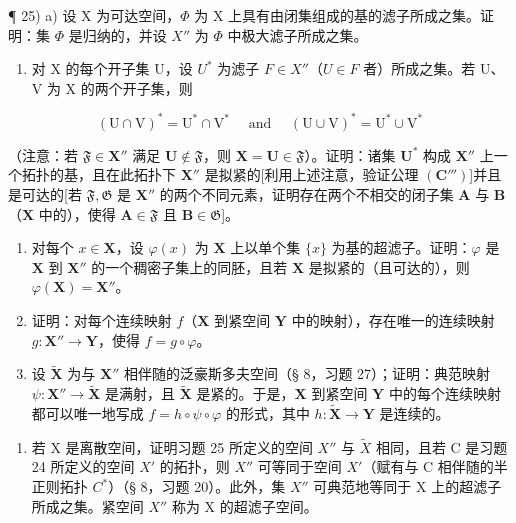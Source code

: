 ¶ 25) a) 设 X 为可达空间，\(\Phi\) 为 X 上具有由闭集组成的基的滤子所成之集。证明：集 \(\Phi\) 是归纳的，并设 \(X''\) 为 \(\Phi\) 中极大滤子所成之集。

\begin{enumerate}
\def\labelenumi{\alph{enumi})}
\setcounter{enumi}{1}
\tightlist
\item
  对 X 的每个开子集 U，设 \(U^{*}\) 为滤子 \(F \in X''\)（\(U \in F\) 者）所成之集。若 U、V 为 X 的两个开子集，则
\end{enumerate}

\[
(\mathrm{U} \cap \mathrm{V}) ^ {*} = \mathrm{U} ^ {*} \cap \mathrm{V} ^ {*} \quad \text { and } \quad (\mathrm{U} \cup \mathrm{V}) ^ {*} = \mathrm{U} ^ {*} \cup \mathrm{V} ^ {*}
\]

（注意：若 \(\mathfrak{F} \in \mathbf{X}''\) 满足 \(\mathbf{U} \notin \mathfrak{F}\)，则 \(\mathbf{X} = \mathbf{U} \in \mathfrak{F}\)）。证明：诸集 \(\mathbf{U}^*\) 构成 \(\mathbf{X}''\) 上一个拓扑的基，且在此拓扑下 \(\mathbf{X}''\) 是拟紧的{[}利用上述注意，验证公理 \((\mathbf{C}''')\){]}并且是可达的{[}若 \(\mathfrak{F}, \mathfrak{G}\) 是 \(\mathbf{X}''\) 的两个不同元素，证明存在两个不相交的闭子集 \(\mathbf{A}\) 与 \(\mathbf{B}\)（\(\mathbf{X}\) 中的），使得 \(\mathbf{A} \in \mathfrak{F}\) 且 \(\mathbf{B} \in \mathfrak{G}\){]}。

\begin{enumerate}
\def\labelenumi{\alph{enumi})}
\setcounter{enumi}{2}
\item
  对每个 \(x \in \mathbf{X}\)，设 \(\varphi(x)\) 为 \(\mathbf{X}\) 上以单个集 \(\{x\}\) 为基的超滤子。证明：\(\varphi\) 是 \(\mathbf{X}\) 到 \(\mathbf{X}''\) 的一个稠密子集上的同胚，且若 \(\mathbf{X}\) 是拟紧的（且可达的），则 \(\varphi(\mathbf{X}) = \mathbf{X}''\)。
\item
  证明：对每个连续映射 \(f\)（\(\mathbf{X}\) 到紧空间 \(\mathbf{Y}\) 中的映射），存在唯一的连续映射 \(g: \mathbf{X}'' \to \mathbf{Y}\)，使得 \(f = g \circ \varphi\)。
\item
  设 \(\tilde{\mathbf{X}}\) 为与 \(\mathbf{X}''\) 相伴随的泛豪斯多夫空间（§ 8，习题 27）；证明：典范映射 \(\psi: \mathbf{X}'' \to \tilde{\mathbf{X}}\) 是满射，且 \(\tilde{\mathbf{X}}\) 是紧的。于是，\(\mathbf{X}\) 到紧空间 \(\mathbf{Y}\) 中的每个连续映射都可以唯一地写成 \(f = h \circ \psi \circ \varphi\) 的形式，其中 \(h: \tilde{\mathbf{X}} \to \mathbf{Y}\) 是连续的。
\end{enumerate}

\begin{enumerate}
\def\labelenumi{\arabic{enumi})}
\setcounter{enumi}{25}
\tightlist
\item
  若 X 是离散空间，证明习题 25 所定义的空间 \(X''\) 与 \(\tilde{X}\) 相同，且若 C 是习题 24 所定义的空间 \(X'\) 的拓扑，则 \(X''\) 可等同于空间 \(X'\)（赋有与 C 相伴随的半正则拓扑 \(C^*\)）（§ 8，习题 20）。此外，集 \(X''\) 可典范地等同于 X 上的超滤子所成之集。紧空间 \(X''\) 称为 X 的超滤子空间。
\end{enumerate}

